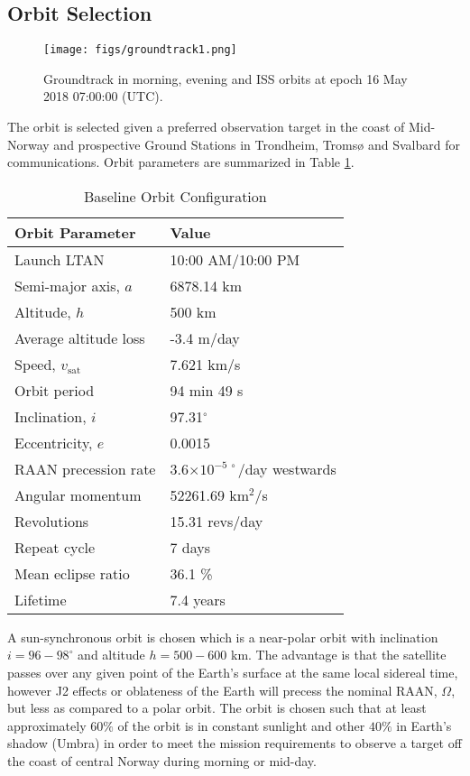 \subsection{Orbit Selection}
\begin{figure*}[htbp]
  \begin{center}
    \texttt{[image: figs/groundtrack1.png]}
    \caption{Groundtrack \hypso in morning, evening and ISS orbits at epoch 16 May 2018 07:00:00 (UTC).}
    \label{fig:groundtrack1}
\end{center}
\end{figure*}
The orbit is selected given a preferred observation target in the coast of Mid-Norway and prospective Ground Stations in Trondheim, Troms{\o} and Svalbard for communications. Orbit parameters are summarized in Table \ref{tab:mission_params}.
\begin{table}[htbp]
	\caption{Baseline Orbit Configuration}
	\label{tab:mission_params}
	\centering
		\begin{tabular}{|l|l|}
			\hline
			Orbit Parameter			&	 Value 			\\ 
			\hline
			Launch LTAN &       10:00 AM/10:00 PM \\
			Semi-major axis, $a$ &  6878.14 km \\
			Altitude, $h$  &     500 km \\
			Average altitude loss & -3.4 m/day \\
			Speed, $v_{\text{sat}}$ & 7.621 km/s \\
			Orbit period & 94 min 49 s \\
			Inclination, $i$ &         97.31$^{\circ}$ \\
			Eccentricity, $e$ &       0.0015 \\
			RAAN precession rate & 3.6$\times 10^{-5 \hspace{3pt}\circ}$/day westwards \\
			Angular momentum & 52261.69 km$^2$/s \\
			Revolutions & 15.31 revs/day \\
			Repeat cycle & 7 days \\	
			Mean eclipse ratio & 36.1 \% \\
			Lifetime & 7.4 years \\
		 \hline
		\end{tabular}
\end{table}
A sun-synchronous orbit is chosen which is a near-polar orbit with inclination $i=96-98^{\circ}$ and altitude $h=500-600$ km. The advantage is that the satellite passes over any given point of the Earth's surface at the same local sidereal time, however J2 effects or oblateness of the Earth will precess the nominal RAAN, $\Omega$, but less as compared to a polar orbit. The orbit is chosen such that at least approximately $60\%$ of the orbit is in constant sunlight and other $40\%$ in Earth's shadow (Umbra) in order to meet the mission requirements to observe a target off the coast of central Norway during morning or mid-day.

